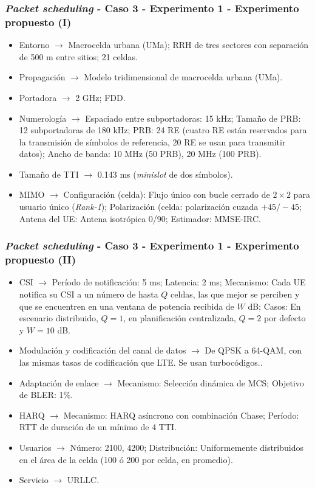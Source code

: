 \documentclass{beamer}
\begin{document}
\begin{frame}
\frametitle{\textit{Packet scheduling} - Caso 3 - Experimento 1 - Experimento propuesto (I)}

\begin{itemize}
\item Entorno $\rightarrow$
Macrocelda urbana (UMa);
RRH de tres sectores con separación de 500 m entre sitios;
21 celdas.
\item Propagación $\rightarrow$
Modelo tridimensional de macrocelda urbana (UMa).
\item Portadora $\rightarrow$
2 GHz;
FDD.
\item Numerología $\rightarrow$
Espaciado entre subportadoras: 15 kHz;
Tamaño de PRB: 12 subportadoras de 180 kHz;
PRB: 24 RE (cuatro RE están reservados para la transmisión de símbolos de referencia, 20 RE se usan para transmitir datos);
Ancho de banda: 10 MHz (50 PRB), 20 MHz (100 PRB).
\item Tamaño de TTI $\rightarrow$
0.143 ms (\textit{minislot} de dos símbolos).
\item MIMO $\rightarrow$
Configuración (celda): Flujo único con bucle cerrado de $2 \times 2$ para usuario único (\textit{Rank-1});
Polarización (celda: polarización cuzada $+45 / -45$;
Antena del UE: Antena isotrópica 0/90;
Estimador: MMSE-IRC.
\end{itemize}
\end{frame}

\begin{frame}
\frametitle{\textit{Packet scheduling} - Caso 3 - Experimento 1 - Experimento propuesto (II)}

\begin{itemize}
\item CSI $\rightarrow$
Período de notificación: 5 ms;
Latencia: 2 ms;
Mecanismo: Cada UE notifica su CSI a un número de hasta $Q$ celdas, las que mejor se perciben y que se encuentren en una ventana de potencia recibida de $W$ dB;
Casos: En escenario distribuido, $Q = 1$, en planificación centralizada, $Q = 2$ por defecto y $W = 10$ dB.
\item Modulación y codificación del canal de datos $\rightarrow$
De QPSK a 64-QAM, con las mismas tasas de codificación que LTE. Se usan turbocódigos..
\item Adaptación de enlace $\rightarrow$
Mecanismo: Selección dinámica de MCS;
Objetivo de BLER: 1\%.
\item HARQ $\rightarrow$
Mecanismo: HARQ asíncrono con combinación Chase;
Período: RTT de duración de un mínimo de 4 TTI.
\item Usuarios $\rightarrow$
Número: 2100, 4200;
Distribución: Uniformemente distribuidos en el área de la celda (100 ó 200 por celda, en promedio).
\item Servicio $\rightarrow$
URLLC.
\end{itemize}
\end{frame}
\end{document}
